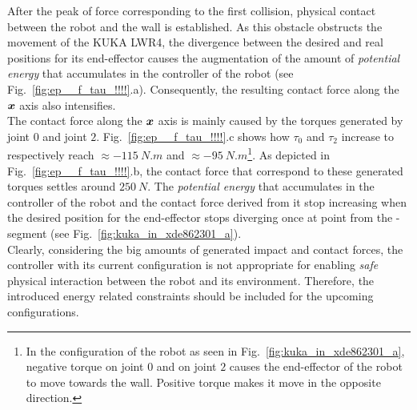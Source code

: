 After the peak of force corresponding to the first collision, physical contact between the robot and the wall is established. As this obstacle obstructs the movement of the KUKA LWR4, the divergence between the desired and real positions for its end-effector causes the augmentation of the amount of \textit{potential energy} that accumulates in the controller of the robot (see Fig.~\ref{fig:ep__f_tau_!!!!}.a). Consequently, the resulting contact force along the $\mbox{\boldmath${x}$}$ axis also intensifies. \\
The contact force along the $\mbox{\boldmath${x}$}$ axis is mainly caused by the torques generated by joint $0$ and joint $2$. Fig.~\ref{fig:ep__f_tau_!!!!}.c shows how $\tau_0$ and $\tau_2$ increase to respectively reach $\approx -115~N.m$ and $\approx -95~N.m$\footnote{In the configuration of the robot as seen in Fig.~\ref{fig:kuka_in_xde862301_a}, negative torque on joint $0$ and on joint $2$ causes the end-effector of the robot to move towards the wall. Positive torque makes it move in the opposite direction.}. As depicted in Fig.~\ref{fig:ep__f_tau_!!!!}.b, the contact force that correspond to these generated torques settles around $250~N$. The \textit{potential energy} that accumulates in the controller of the robot and the contact force derived from it stop increasing when the desired position for the end-effector stops diverging once at point  from the - segment (see Fig.~\ref{fig:kuka_in_xde862301_a}).\\
Clearly, considering the big amounts of generated impact and contact forces, the controller with its current configuration is not appropriate for enabling \textit{safe} physical interaction between the robot and its environment. Therefore, the introduced energy related constraints should be included for the upcoming configurations.
